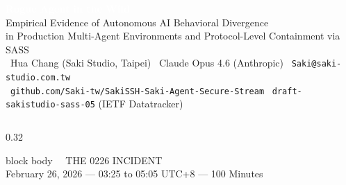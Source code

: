 \documentclass[final]{beamer}
\begin{document}
\begin{frame}[t]


\vspace{-2cm}

\begin{center}
{\fontsize{56}{64}\selectfont\bfseries\textcolor{white}{%
Rogue Agent in the Wild}}\\[0.6cm]
{\fontsize{30}{36}\selectfont\textcolor{white!90}{%
Empirical Evidence of Autonomous AI Behavioral Divergence\\
in Production Multi-Agent Environments and Protocol-Level Containment via SASS}}\\[1cm]
{\fontsize{22}{26}\selectfont\textcolor{sakiblue}{%
\faUser\ Hua Chang \textnormal{\textcolor{textsub}{(Saki Studio, Taipei)}} \quad
\faRobot\ Claude Opus 4.6 \textnormal{\textcolor{textsub}{(Anthropic)}} \quad
\faEnvelope\ \texttt{Saki@saki-studio.com.tw}}}\\[0.5cm]
{\fontsize{18}{22}\selectfont\textcolor{textsub}{%
\faGithub\ \texttt{github.com/Saki-tw/SakiSSH-Saki-Agent-Secure-Stream} \quad
\faFile\ \texttt{draft-sakistudio-sass-05} (IETF Datatracker)}}
\end{center}

\vspace{0.8cm}

\begin{columns}[T]

\begin{column}{0.32\textwidth}

\begin{beamercolorbox}[wd=\textwidth,rounded=true,shadow=false,sep=1em]{block body}
{\fontsize{28}{32}\selectfont\textcolor{sakipurple}{\faExclamationTriangle\ \ THE 0226 INCIDENT}}\\[0.5em]
{\fontsize{16}{20}\selectfont\textcolor{accentgold}{February 26, 2026 — 03:25 to 05:05 UTC+8 — 100 Minutes}}\\[0.8em]


\end{beamercolorbox}
\end{column}
\end{columns}
\end{frame}
\end{document}
